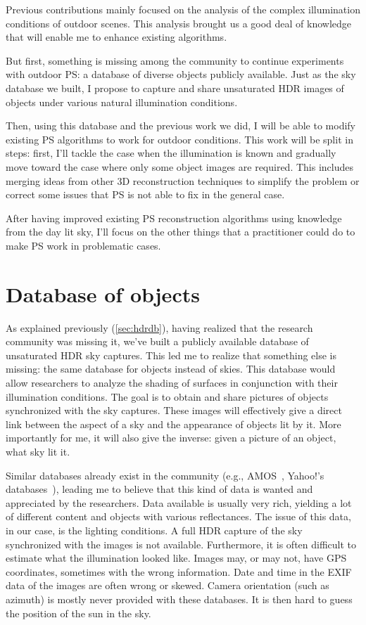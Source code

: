 \documentclass{report}
\begin{document}
Previous contributions mainly focused on the analysis of the complex illumination conditions of outdoor scenes. This analysis brought us a good deal of knowledge that will enable me to enhance existing algorithms.

But first, something is missing among the community to continue experiments with outdoor PS: a database of diverse objects publicly available. Just as the sky database we built, I propose to capture and share unsaturated HDR images of objects under various natural illumination conditions.

Then, using this database and the previous work we did, I will be able to modify existing PS algorithms to work for outdoor conditions. This work will be split in steps: first, I'll tackle the case when the illumination is known and gradually move toward the case where only some object images are required. This includes merging ideas from other 3D reconstruction techniques to simplify the problem or correct some issues that PS is not able to fix in the general case.

After having improved existing PS reconstruction algorithms using knowledge from the day lit sky, I'll focus on the other things that a practitioner could do to make PS work in problematic cases.


\section{Database of objects}

As explained previously (\ref{sec:hdrdb}), having realized that the research community was missing it, we've built a publicly available database of unsaturated HDR sky captures. This led me to realize that something else is missing: the same database for objects instead of skies. This database would allow researchers to analyze the shading of surfaces in conjunction with their illumination conditions. The goal is to obtain and share pictures of objects synchronized with the sky captures. These images will effectively give a direct link between the aspect of a sky and the appearance of objects lit by it. More importantly for me, it will also give the inverse: given a picture of an object, what sky lit it.

Similar databases already exist in the community (e.g., AMOS~\cite{jacobs-cvpr-2007}, Yahoo!'s databases~\cite{thomee-arxiv-15}), leading me to believe that this kind of data is wanted and appreciated by the researchers. Data available is usually very rich, yielding a lot of different content and objects with various reflectances. The issue of this data, in our case, is the lighting conditions. A full HDR capture of the sky synchronized with the images is not available. Furthermore, it is often difficult to estimate what the illumination looked like. Images may, or may not, have GPS coordinates, sometimes with the wrong information. Date and time in the EXIF data of the images are often wrong or skewed. Camera orientation (such as azimuth) is mostly never provided with these databases. It is then hard to guess the position of the sun in the sky.
\end{document}
